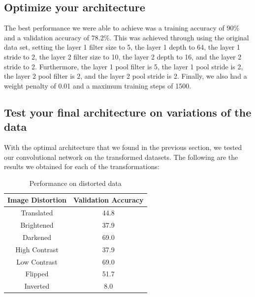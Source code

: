 \documentclass{article}
\begin{document}
\subsection{Optimize your architecture}
The best performance we were able to achieve was a training accuracy of 90\% and a validation accuracy of 78.2\%.  This was achieved through using the original data set, setting the layer 1 filter size to 5, the layer 1 depth to 64, the layer 1 stride to 2, the layer 2 filter size to 10, the layer 2 depth to 16, and the layer 2 stride to 2. Furthermore, the layer 1 pool filter is 5, the layer 1 pool stride is 2, the layer 2 pool filter is 2, and the layer 2 pool stride is 2. Finally, we also had a weight penalty of 0.01 and a maximum training steps of 1500. 

\subsection{Test your final architecture on variations of the data}
With the optimal architecture that we found in the previous section, we tested our convolutional network on the transformed datasets. The following are the results we obtained for each of the transformations:

\begin{table}
  \begin{center}
    \begin{tabular}{ | c | c |}
      \hline
      Image Distortion & Validation Accuracy \\ \hline
      Translated   & 44.8          \\ \hline
      Brightened  & 37.9        \\ \hline
      Darkened & 69.0     \\ \hline
      High Contrast   & 37.9       \\ \hline
      Low Contrast   & 69.0       \\ \hline
      Flipped   & 51.7       \\ \hline
      Inverted   & 8.0       \\ \hline
    \end{tabular}
  \end{center}
  \caption{Performance on distorted data}
\end{table}
\end{document}
